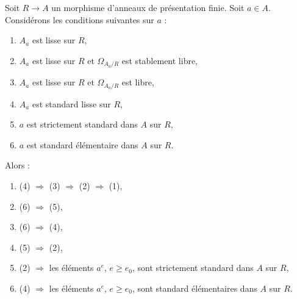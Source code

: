 \begin{lemma}
\label{lemma-compare-standard}
Soit $R \to A$ un morphisme d'anneaux de présentation finie.
Soit $a \in A$. Considérons les conditions suivantes sur $a$ :
\begin{enumerate}
\item $A_a$ est lisse sur $R$,
\item $A_a$ est lisse sur $R$ et $\Omega_{A_a/R}$ est stablement libre,
\item $A_a$ est lisse sur $R$ et $\Omega_{A_a/R}$ est libre,
\item $A_a$ est standard lisse sur $R$,
\item $a$ est strictement standard dans $A$ sur $R$,
\item $a$ est standard élémentaire dans $A$ sur $R$.
\end{enumerate}
Alors :
\begin{enumerate}
\item[(a)] (4) $\Rightarrow$ (3) $\Rightarrow$ (2) $\Rightarrow$ (1),
\item[(b)] (6) $\Rightarrow$ (5),
\item[(c)] (6) $\Rightarrow$ (4),
\item[(d)] (5) $\Rightarrow$ (2),
\item[(e)] (2) $\Rightarrow$ les éléments $a^e$, $e \geq e_0$, sont
strictement standard dans $A$ sur $R$,
\item[(f)] (4) $\Rightarrow$ les éléments $a^e$, $e \geq e_0$, sont standard
élémentaires dans $A$ sur $R$.
\end{enumerate}
\end{lemma}

